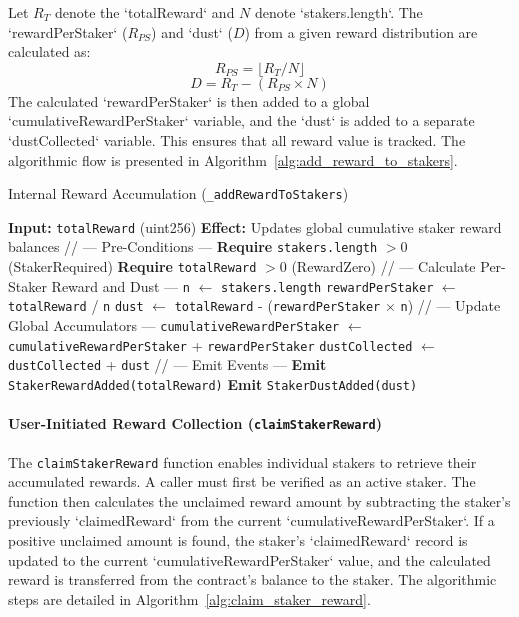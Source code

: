 \documentclass{DESSThesis}
\begin{document}
Let $R_T$ denote the `totalReward` and $N$ denote `stakers.length`. The `rewardPerStaker` ($R_{PS}$) and `dust` ($D$) from a given reward distribution are calculated as:
\[
R_{PS} = \lfloor R_T / N \rfloor
\]
\[
D = R_T - (R_{PS} \times N)
\]
The calculated `rewardPerStaker` is then added to a global `cumulativeRewardPerStaker` variable, and the `dust` is added to a separate `dustCollected` variable. This ensures that all reward value is tracked. The algorithmic flow is presented in Algorithm~\ref{alg:add_reward_to_stakers}.

\begin{algorithm}[htbp]
\caption{Internal Reward Accumulation (\texttt{\_addRewardToStakers})}
\label{alg:add_reward_to_stakers}
\begin{algorithmic}[1]
        \State \textbf{Input:} \texttt{totalReward} (uint256)
        \State \textbf{Effect:} Updates global cumulative staker reward balances
        \State
        \State // --- Pre-Conditions ---
        \State \textbf{Require} \texttt{stakers.length} $> 0$ (StakerRequired)
        \State \textbf{Require} \texttt{totalReward} $> 0$ (RewardZero)
        \State
        \State // --- Calculate Per-Staker Reward and Dust ---
        \State \texttt{n} $\gets$ \texttt{stakers.length}
        \State \texttt{rewardPerStaker} $\gets$ \texttt{totalReward} / \texttt{n}
        \State \texttt{dust} $\gets$ \texttt{totalReward} - (\texttt{rewardPerStaker} $\times$ \texttt{n})
        \State
        \State // --- Update Global Accumulators ---
        \State \texttt{cumulativeRewardPerStaker} $\gets$ \texttt{cumulativeRewardPerStaker} + \texttt{rewardPerStaker}
        \State \texttt{dustCollected} $\gets$ \texttt{dustCollected} + \texttt{dust}
        \State
        \State // --- Emit Events ---
        \State \textbf{Emit} \texttt{StakerRewardAdded(totalReward)}
        \State \textbf{Emit} \texttt{StakerDustAdded(dust)}
    \EndProcedure
\end{algorithmic}
\end{algorithm}

\paragraph{User-Initiated Reward Collection (\texttt{claimStakerReward})}
The \texttt{claimStakerReward} function enables individual stakers to retrieve their accumulated rewards. A caller must first be verified as an active staker. The function then calculates the unclaimed reward amount by subtracting the staker's previously `claimedReward` from the current `cumulativeRewardPerStaker`. If a positive unclaimed amount is found, the staker's `claimedReward` record is updated to the current `cumulativeRewardPerStaker` value, and the calculated reward is transferred from the contract's balance to the staker. The algorithmic steps are detailed in Algorithm~\ref{alg:claim_staker_reward}.
\end{document}
